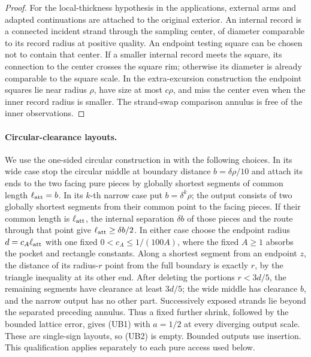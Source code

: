 \begin{proof}
For the local-thickness hypothesis in the applications, external
arms and adapted continuations are attached to the original exterior.
An internal record is a connected incident strand through the sampling
center, of diameter comparable to its record radius at positive quality.
An endpoint testing square can be chosen not to contain that center.
If a smaller internal record meets the square, its connection to the
center crosses the square rim; otherwise its diameter is already
comparable to the square scale.  In the extra-excursion construction
the endpoint squares lie near radius \(\rho\), have size at most
\(c\rho\), and miss the center even when the inner record radius is
smaller.  The strand-swap comparison annulus is free of the inner
observations.
\end{proof}

\paragraph{Circular-clearance layouts.}
We use the one-sided circular construction in
\cite[proof of (3.48)]{SSdiscrete} with the following choices.
In its wide case stop the circular middle at boundary distance
\(b=\delta\rho/10\) and attach its ends to the two facing pure
pieces by globally shortest segments of common length
\(\ell_{\rm att}=b\).
In its \(k\)-th narrow case put \(b=\delta^k\rho\); the output
consists of two globally shortest segments from their common point
to the facing pieces.  If their common length is \(\ell_{\rm att}\),
the internal separation \(\delta b\) of those pieces and the route
through that point give \(\ell_{\rm att}\ge\delta b/2\).
In either case choose the endpoint radius
\(d=c_A\ell_{\rm att}\) with one fixed \(0<c_A\le1/(100A)\),
where the fixed \(A\ge1\) absorbs
the pocket and rectangle constants.  Along a shortest segment from
an endpoint \(z\), the distance of its radius-\(r\) point from the
full boundary is exactly \(r\), by the triangle inequality at its
other end.  After deleting the portions \(r<3d/5\), the remaining
segments have clearance at least \(3d/5\); the wide middle has
clearance \(b\), and the narrow output has no other part.
Successively exposed strands lie beyond the separated preceding
annulus.  Thus a fixed further shrink, followed by the bounded
lattice error, gives (UB1) with \(a=1/2\) at every diverging output
scale.  These are single-sign layouts, so (UB2) is empty.  Bounded
outputs use insertion.  This qualification applies separately to
each pure access used below.


